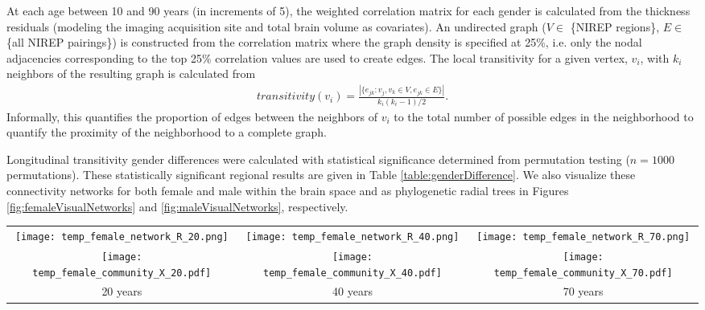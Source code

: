 At each age between 10 and 90 years (in increments of 5), the weighted correlation
matrix for each gender is calculated from the thickness residuals 
(modeling the imaging acquisition site and total brain volume as covariates).  An undirected graph ($V \in$ \{NIREP regions\}, $E \in$ \{all NIREP pairings\})
is constructed from the correlation matrix where the graph density is specified at 25\%, i.e. only the nodal adjacencies corresponding to the top 25\% correlation values are used to create edges.    The local transitivity for a given vertex, $v_i$, with $k_i$ neighbors of the resulting graph is calculated from
\begin{align}
  transitivity(v_i) = \frac{|\{e_{jk}: v_j, v_k \in V, e_{jk} \in E \}|}{k_i (k_i-1)/2}.
\end{align}
Informally, this quantifies the proportion of edges between the neighbors of $v_i$ to the total number of possible edges in the neighborhood to quantify the proximity of the neighborhood to a complete graph.  

Longitudinal transitivity gender differences were calculated with statistical
significance determined from permutation testing ($n = 1000$ permutations).  These statistically significant regional results are given in Table \ref{table:genderDifference}.  
We also visualize these connectivity networks for both female and male within the brain
space and as phylogenetic radial trees in Figures \ref{fig:femaleVisualNetworks} and \ref{fig:maleVisualNetworks}, respectively.

\begin{figure*}[htb]
  \centering
  \begin{tabular}{ccc}
  \texttt{[image: temp\_female\_network\_R\_20.png]} &
  \texttt{[image: temp\_female\_network\_R\_40.png]} &
  \texttt{[image: temp\_female\_network\_R\_70.png]} \\
  \texttt{[image: temp\_female\_community\_X\_20.pdf]} &
  \texttt{[image: temp\_female\_community\_X\_40.pdf]} &
  \texttt{[image: temp\_female\_community\_X\_70.pdf]} \\
  20 years & 40 years & 70 years 
  \end{tabular}
  \caption{Visual illustration of the female thickness networks for ages 20, 40, 
  and 70 years.  Community relationships between regions are depicted both in 
  brain space (top row) and as a radial phylogenetic tree where colors denote 
  neighborhoods (bottom row).
  }
  \label{fig:femaleVisualNetworks}
\end{figure*}

